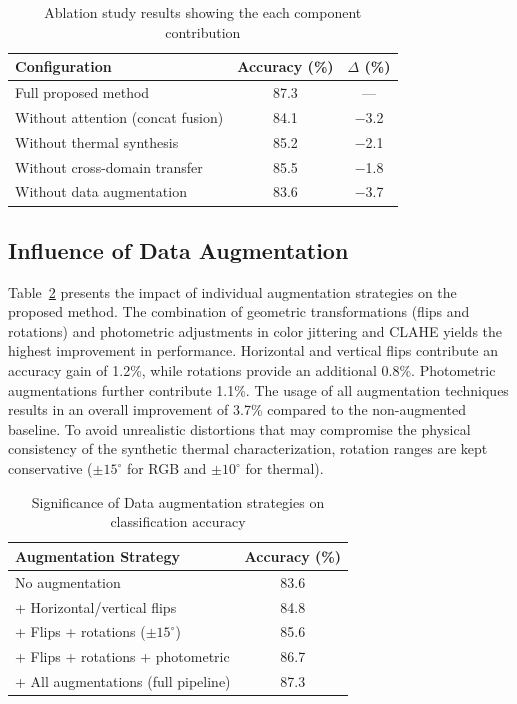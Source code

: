 \documentclass[utf8]{FrontiersinHarvard} %
\begin{document}
\begin{table}[!ht]
    \centering
    \caption{Ablation study results showing the each component contribution}
    \label{tab:ablation}
    \footnotesize
    \begin{tabular}{lcc}
        \toprule
        \textbf{Configuration} & \textbf{Accuracy (\%)} & \textbf{$\Delta$ (\%)} \\
        \midrule
        Full proposed method & 87.3 & --- \\
        Without attention (concat fusion) & 84.1 & $-$3.2 \\
        Without thermal synthesis & 85.2 & $-$2.1 \\
        Without cross-domain transfer & 85.5 & $-$1.8 \\
        Without data augmentation & 83.6 & $-$3.7 \\
        \bottomrule
    \end{tabular}
\end{table}

\subsection{Influence of Data Augmentation}
\label{sec:augmentation_ablation}
Table~\ref{tab:augmentation} presents the impact of individual augmentation strategies on the proposed method. The combination of geometric transformations (flips and rotations) and photometric adjustments in color jittering and CLAHE yields the highest improvement in performance. Horizontal and vertical flips contribute an accuracy gain of 1.2\%, while rotations provide an additional 0.8\%. Photometric augmentations further contribute 1.1\%. The usage of all augmentation techniques results in an overall improvement of 3.7\% compared to the non-augmented baseline.
To avoid unrealistic distortions that may compromise the physical consistency of the synthetic thermal characterization, rotation ranges are kept conservative ($\pm 15^{\circ}$ for RGB and $\pm 10^{\circ}$ for thermal).

\begin{table}[!ht]
    \centering
    \caption{Significance of Data augmentation strategies on classification accuracy}
    \label{tab:augmentation}
    \footnotesize
    \begin{tabular}{lc}
        \toprule
        \textbf{Augmentation Strategy} & \textbf{Accuracy (\%)} \\
        \midrule
        No augmentation & 83.6 \\
        + Horizontal/vertical flips & 84.8 \\
        + Flips + rotations ($\pm 15^{\circ}$) & 85.6 \\
        + Flips + rotations + photometric & 86.7 \\
        + All augmentations (full pipeline) & 87.3 \\
        \bottomrule
    \end{tabular}
\end{table}
\end{document}

